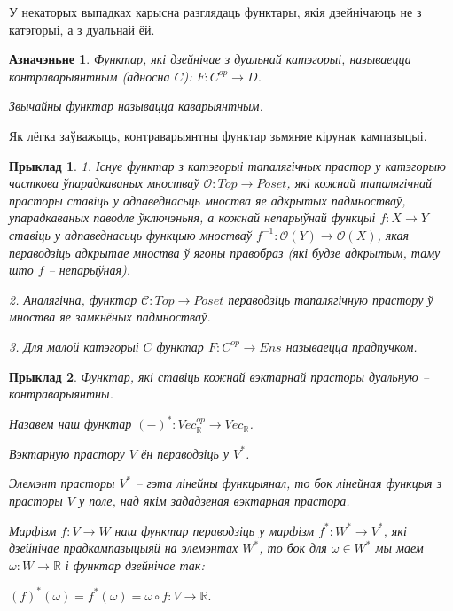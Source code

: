 \documentclass[a4paper,12pt]{book}
\newtheorem{example}{Прыклад}[section]
\newtheorem{definition}{Азначэньне}[section]
\begin{document}
У некаторых выпадках карысна разглядаць функтары, якія дзейнічаюць не
з катэгорыі, а з дуальнай ёй.

\begin{definition}
  Функтар, які дзейнічае з дуальнай катэгорыі, называецца
  контраварыянтным (адносна $C$): $F: C^{op} \rightarrow D$.

  Звычайны функтар называцца каварыянтным.
\end{definition}

Як лёгка заўважыць, контраварыянтны функтар зьмяняе кірунак
кампазыцыі.

\begin{example}
  1. Існуе функтар з катэгорыі тапалягічных прастор у катэгорыю часткова
  ўпарадкаваных мностваў $\mathcal{O}: Top \rightarrow Poset$, які
  кожнай тапалягічнай прасторы ставіць у адпаведнасьць мноства яе
  адкрытых падмностваў, упарадкаваных паводле ўключэньня, а кожнай
  непарыўнай функцыі $f: X \rightarrow Y$ ставіць у адпаведнасьць
  функцыю мностваў $f^{-1}: \mathcal{O}(Y) \rightarrow
  \mathcal{O}(X)$, якая пераводзіць адкрытае мноства ў ягоны правобраз
  (які будзе адкрытым, таму што $f$ -- непарыўная).

  2. Аналягічна, функтар $\mathcal{C}: Top \rightarrow Poset$
  пераводзіць тапалягічную прастору ў мноства яе замкнёных
  падмностваў.

  3. Для малой катэгорыі $C$ функтар $F: C^{op} \rightarrow Ens$
  называецца прадпучком.
\end{example}

\begin{example}
  Функтар, які ставіць кожнай вэктарнай прасторы дуальную --
  контраварыянтны.

  Назавем наш функтар $(-)^*: Vec_{\mathbb{R}}^{op} \rightarrow Vec_{\mathbb{R}}$.

  Вэктарную прастору $V$ ён пераводзіць у $V^*$.

  Элемэнт прасторы $V^*$ -- гэта лінейны функцыянал, то бок лінейная
  функцыя з прасторы $V$ у поле, над якім зададзеная вэктарная прастора.

  Марфізм $f: V \rightarrow W$ наш функтар пераводзіць у марфізм $f^*:
  W^* \rightarrow V^*$, які дзейнічае прадкампазыцыяй на элемэнтах
  $W^*$, то бок для $\omega \in W^*$ мы маем $\omega: W \rightarrow
  \mathbb{R}$ і функтар дзейнічае так:

  $(f)^*(\omega) = f^*(\omega) = \omega \circ f: V \rightarrow
  \mathbb{R}.$
\end{example}
\end{document}

